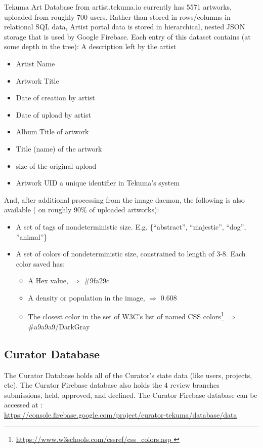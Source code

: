 \documentclass[fontsize=12pt]{scrartcl} %
\begin{document}
Tekuma Art Database from artist.tekuma.io currently has 5571 artworks, uploaded from roughly 700 users. Rather than stored in rows/columns in relational SQL data, Artist portal data is stored in hierarchical, nested JSON storage that is used by Google Firebase. Each entry of this dataset contains (at some depth in the tree):
A description left by the artist
\begin{itemize}
    \item Artist Name
    \item Artwork Title
    \item Date of creation by artist
    \item Date of upload by artist
    \item Album Title of artwork
    \item Title (name) of the artwork
    \item size of the original upload
    \item Artwork UID a unique identifier in Tekuma's system
\end{itemize}
And, after additional processing from the image daemon, the following is also available ( on roughly 90\% of uploaded artworks):
\begin{itemize}
    \item A set of tags of nondeterministic size. E.g. \{“abstract”, “majestic”, “dog”, ”animal”\}
    \item A set of colors of nondeterministic size, constrained to length of 3-8. Each color saved has: \begin{itemize}
        \item A Hex value,  $\Rightarrow$ \#9fa29c
        \item A density or population in the image,  $\Rightarrow$ 0.608
        \item The closest color in the set of W3C’s list of named CSS colors\footnote{\url{https://www.w3schools.com/cssref/css_colors.asp }} $\Rightarrow$  \#a9a9a9/DarkGray
    \end{itemize}

\end{itemize}


\subsection{Curator Database}
The Curator Database holds all of the Curator's state data (like users, projects, etc). The Curator Firebase database also holds the 4 review branches submissions, held, approved, and declined. The Curator Firebase database can be accessed at : \\
\url{https://console.firebase.google.com/project/curator-tekuma/database/data}
\end{document}
